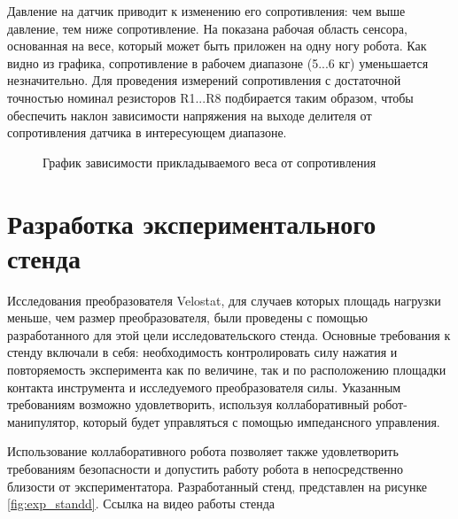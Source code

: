  Давление на датчик приводит к изменению его сопротивления: чем выше давление, тем ниже сопротивление. На  показана рабочая область сенсора, основанная на весе, который может быть приложен на одну ногу робота. Как видно из графика, сопротивление в рабочем диапазоне (5...6 кг) уменьшается незначительно. Для проведения измерений сопротивления с достаточной точностью номинал резисторов R1...R8 подбирается таким образом, чтобы обеспечить наклон зависимости напряжения на выходе делителя от сопротивления датчика в интересующем диапазоне.
\begin{figure}[H]
    \centering
    \caption{График зависимости прикладываемого веса от сопротивления}
    \label{fig:velostat_pressure_resistance.jpg}
\end{figure}

\section{Разработка экспериментального стенда}

Исследования преобразователя Velostat, для случаев которых площадь нагрузки меньше, чем размер преобразователя, были проведены с помощью разработанного для этой цели исследовательского стенда. Основные требования к стенду включали в себя: необходимость контролировать силу нажатия и повторяемость эксперимента как по величине, так и по расположению площадки контакта инструмента и исследуемого преобразователя силы. Указанным требованиям возможно удовлетворить, используя коллаборативный робот-манипулятор, который будет управляться с помощью импедансного управления.

Использование коллаборативного робота позволяет также удовлетворить требованиям безопасности и допустить работу робота в непосредственно близости от экспериментатора. Разработанный стенд, представлен на рисунке \ref{fig:exp_standd}. Ссылка на видео работы стенда \quad {}

